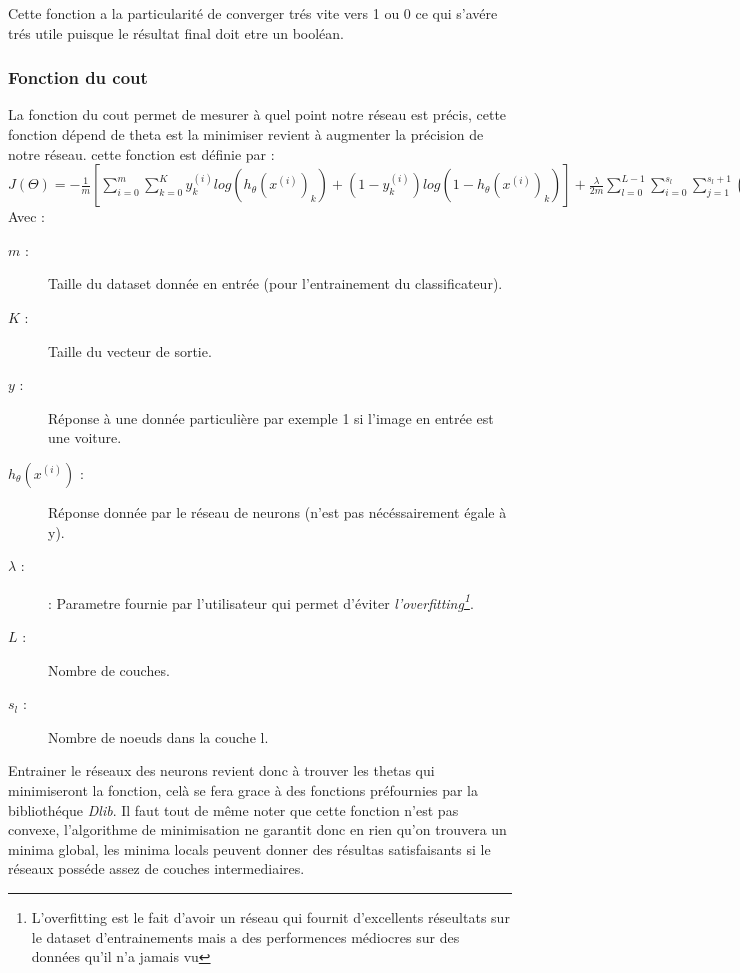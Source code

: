 
Cette fonction a la particularité de converger trés vite vers 1 ou 0 ce qui s'avére trés utile puisque le résultat final doit etre un booléan.

\subsubsection{Fonction du cout}

La fonction du cout permet de mesurer à quel point notre réseau est précis, cette fonction dépend de theta est la minimiser revient à augmenter la précision de notre réseau. cette fonction est définie par : $J(\Theta) = -\frac{1}{m}[\sum\limits_{i=0}^m\sum\limits_{k=0}^K y_k^{(i)}log(h_\theta(x^{(i)})_k) + (1 - y_k^{(i)})log(1 - h_\theta(x^{(i)})_k)] + \frac{\lambda}{2m}\sum\limits_{l=0}^{L - 1}\sum\limits_{i=0}^{s_l}\sum\limits_{j=1}^{s_l + 1}(\Theta_j^{(l)})^2$ Avec :

\begin{description}

\item[$m$ : ] Taille du dataset donnée en entrée (pour l'entrainement du classificateur).
\item[$K$ : ] Taille du vecteur de sortie.
\item[$y$ : ] Réponse à une donnée particulière par exemple 1 si l'image en entrée est une voiture.
\item[$h_\theta(x^{(i)})$ : ] Réponse donnée par le réseau de neurons (n'est pas nécéssairement égale à y).
\item[$\lambda$ : ] : Parametre fournie par l'utilisateur qui permet d'éviter \textit{l'overfitting\footnote{L'overfitting est le fait d'avoir un réseau qui fournit d'excellents réseultats sur le dataset d'entrainements mais a des performences médiocres sur des données qu'il n'a jamais vu}}.
\item[$L$ : ] Nombre de couches.
\item[$s_l$ : ] Nombre de noeuds dans la couche l.

\end{description}

Entrainer le réseaux des neurons revient donc à trouver les thetas qui minimiseront la fonction, celà se fera grace à des fonctions préfournies par la bibliothéque \textit{Dlib}.
Il faut tout de même noter que cette fonction n'est pas convexe, l'algorithme de minimisation ne garantit donc en rien qu'on trouvera un minima global, les minima locals peuvent donner des résultas satisfaisants si le réseaux posséde assez de couches intermediaires.

